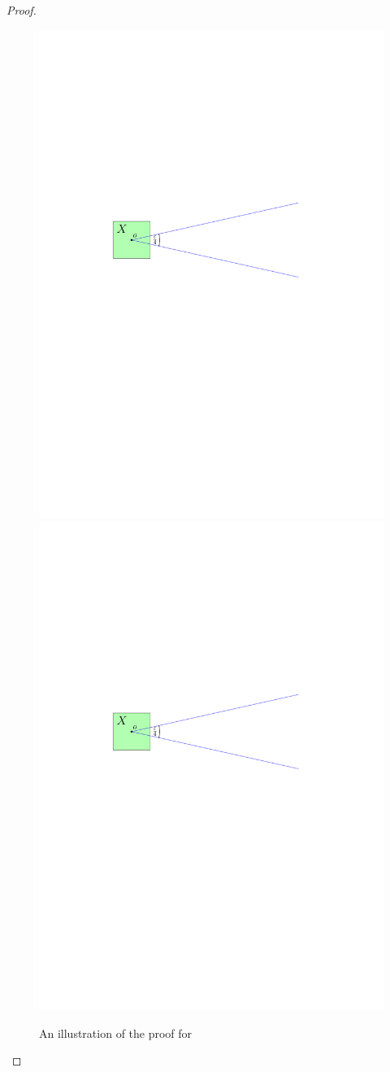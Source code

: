 \begin{proof}
    \begin{figure}[h]
    \phantom{}\hfill%
    \includegraphics[page=2, width=0.48\linewidth]{../figs/double_wedge}%
    \hfill%
    \includegraphics[page=3, width=0.48\linewidth]{../figs/double_wedge}%
    \hfill%
    \phantom{}%
    \caption{An illustration of the proof for }
\end{figure}


\end{proof}
